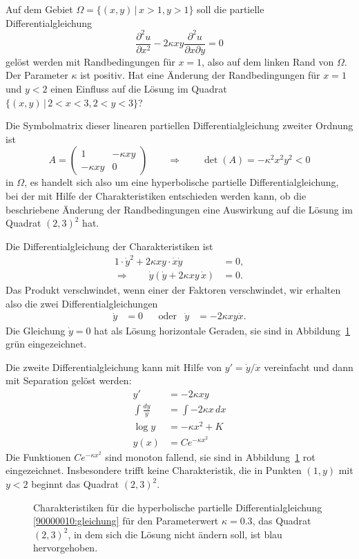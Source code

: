 Auf dem Gebiet $\Omega=\{(x,y)\,|\, x>1, y>1\}$ soll die partielle
Differentialgleichung
\begin{equation}
\frac{\partial^2 u}{\partial x^2}-2\kappa xy\frac{\partial^2 u}{\partial x\partial y}=0
\label{90000010:gleichung}
\end{equation}
gelöst werden mit Randbedingungen für $x=1$, also auf dem linken Rand von
$\Omega$. Der Parameter $\kappa$ ist positiv.
Hat eine Änderung der Randbedingungen für $x=1$ und $y<2$ einen
Einfluss auf die Lösung im Quadrat $\{(x,y)\,|\, 2<x<3,2<y<3\}$?

\begin{loesung}
Die Symbolmatrix dieser linearen partiellen Differentialgleichung zweiter
Ordnung ist
\[
A=\begin{pmatrix}
1&-\kappa xy\\
-\kappa xy&0
\end{pmatrix}
\qquad
\Rightarrow
\qquad
\det(A)=-\kappa^2x^2y^2<0
\]
in $\Omega$, es handelt sich also um eine hyperbolische partielle
Differentialgleichung, bei der mit Hilfe der Charakteristiken entschieden
werden kann, ob die beschriebene Änderung der Randbedingungen eine 
Auswirkung auf die Lösung im Quadrat $(2,3)^2$ hat.

Die Differentialgleichung der Charakteristiken ist
\begin{align*}
1\cdot \dot y^2 +2\kappa xy\cdot \dot x \dot y&=0,\\
\Rightarrow\qquad
\dot y(\dot y+2\kappa xy\,\dot x)&=0.
\end{align*}
Das Produkt verschwindet, wenn einer der Faktoren verschwindet, wir erhalten
also die zwei Differentialgleichungen
\begin{align*}
\dot y &= 0
&
&\text{oder}
&
\dot y&=-2\kappa xy\dot x.
\end{align*}
Die Gleichung $\dot y=0$ hat als Lösung horizontale Geraden, sie sind
in Abbildung~\ref{90000010:bild} grün eingezeichnet.

Die zweite Differentialgleichung kann mit Hilfe von $y'=\dot y/\dot x$ 
vereinfacht und dann mit Separation gelöst werden:
\begin{align*}
y'&=-2\kappa xy\\
\int \frac{dy}y&=\int -2\kappa x\,dx\\
\log y&=-\kappa x^2+K\\
y(x)&=Ce^{-\kappa x^2}
\end{align*}
Die Funktionen $Ce^{-\kappa x^2}$ sind monoton fallend, sie sind in
Abbildung~\ref{90000010:bild} rot eingezeichnet.
Insbesondere trifft
keine Charakteristik, die in Punkten $(1,y)$ mit $y<2$ beginnt das
Quadrat $(2,3)^2$.
\begin{figure}
\begin{center}
\end{center}
\caption{Charakteristiken für die hyperbolische partielle
Differentialgleichung \eqref{90000010:gleichung} für den Parameterwert
$\kappa =0.3$, das Quadrat $(2,3)^2$, in dem sich die Lösung nicht
ändern soll, ist blau hervorgehoben.
\label{90000010:bild}}
\end{figure}
\end{loesung}

